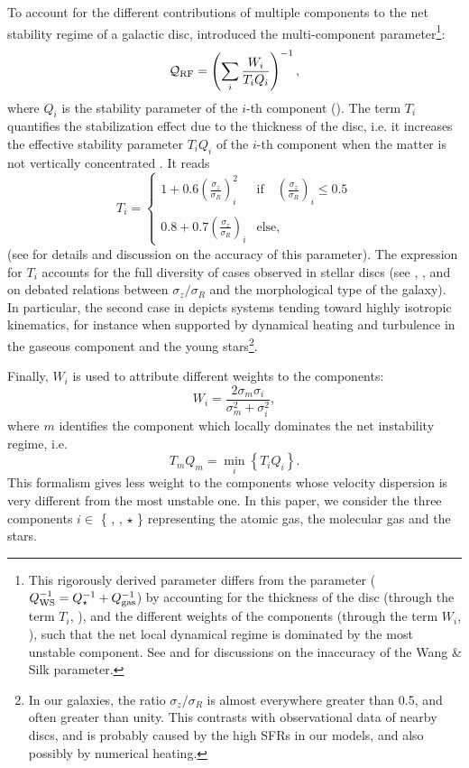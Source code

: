 \documentclass[useAMS,usenatbib]{mnras}
\newcommand{\qrf}{\ensuremath{\mathcal{Q}_{\rm RF}}\xspace}
\begin{document}
To account for the different contributions of multiple components to the net stability regime of a galactic disc, \citet{Romeo2013} introduced the multi-component parameter\footnote{This rigorously derived parameter differs from the \citet{Wang1994} parameter ($Q_{\rm WS}^{-1} = Q_\star^{-1} + Q_{\rm gas}^{-1}$) by accounting for the thickness of the disc (through the term $T_i$, ), and the different weights of the components (through the term $W_i$, ), such that the net local dynamical regime is dominated by the most unstable component. See \citet{Jog1996} and \citet{Romeo2011} for discussions on the inaccuracy of the Wang \& Silk parameter.}:
\begin{equation}
\label{eqn:qrf}
\qrf = \left( \sum_i \frac{W_i}{T_i Q_i}\right)^{-1},
\end{equation}
where $Q_i$ is the stability parameter of the $i$-th component (). The term $T_i$ quantifies the stabilization effect due to the thickness of the disc, i.e. it increases the effective stability parameter $T_iQ_i$ of the $i$-th component when the matter is not vertically concentrated \citep{Romeo1994}. It reads
\begin{equation}
\label{eqn:t}
T_i = \left\{ 
\begin{array}{ll}
1+0.6 \left(\frac{\sigma_z}{\sigma_R}\right)_i^2 & \textrm{if} \quad \left(\frac{\sigma_z}{\sigma_R}\right)_i \leq 0.5\\
\\
0.8+0.7 \left(\frac{\sigma_z}{\sigma_R}\right)_i & \textrm{else},
\end{array}
\right.
\end{equation}
(see \citealt{Romeo2013} for details and discussion on the accuracy of this parameter). The expression for $T_i$ accounts for the full diversity of cases observed in stellar discs (see \citealt{Gerssen2012}, \citealt{Pinna2018}, and \citealt{Walo2021} on debated relations between $\sigma_z/\sigma_R$ and the morphological type of the galaxy). In particular, the second case in  depicts systems tending toward highly isotropic kinematics, for instance when supported by dynamical heating and turbulence in the gaseous component and the young stars\footnote{In our galaxies, the ratio $\sigma_z/\sigma_R$ is almost everywhere greater than 0.5, and often greater than unity. This contrasts with observational data of nearby discs, and is probably caused by the high SFRs in our models, and also possibly by numerical heating.}. 

Finally, $W_i$ is used to attribute different weights to the components:
\begin{equation}
\label{eqn:w}
W_i = \frac{2\sigma_m\sigma_i}{\sigma_m^2+\sigma_i^2},
\end{equation}
where $m$ identifies the component which locally dominates the net instability regime, i.e.
\begin{equation}
\label{eqn:m}
T_mQ_m = \min_{i}\left\{T_iQ_i\right\}.
\end{equation}
This formalism gives less weight to the components whose velocity dispersion is very different from the most unstable one. In this paper, we consider the three components $i \in$ \{ \hi, \htwo, $\star$ \} representing the atomic gas, the molecular gas and the stars. 
\end{document}

